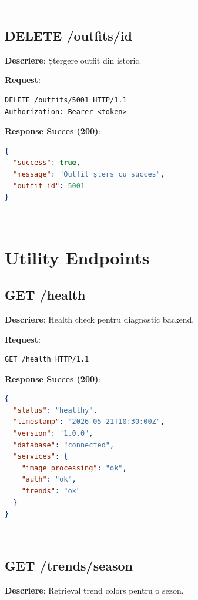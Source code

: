 ---

\subsection{DELETE /outfits/{id}}

\textbf{Descriere}: Ștergere outfit din istoric.

\textbf{Request}:

\begin{lstlisting}[language=HTTP]
DELETE /outfits/5001 HTTP/1.1
Authorization: Bearer <token>
\end{lstlisting}

\textbf{Response Succes (200)}:

\begin{lstlisting}[language=JSON]
{
  "success": true,
  "message": "Outfit șters cu succes",
  "outfit_id": 5001
}
\end{lstlisting}

---

\section{Utility Endpoints}

\subsection{GET /health}

\textbf{Descriere}: Health check pentru diagnostic backend.

\textbf{Request}:

\begin{lstlisting}[language=HTTP]
GET /health HTTP/1.1
\end{lstlisting}

\textbf{Response Succes (200)}:

\begin{lstlisting}[language=JSON]
{
  "status": "healthy",
  "timestamp": "2026-05-21T10:30:00Z",
  "version": "1.0.0",
  "database": "connected",
  "services": {
    "image_processing": "ok",
    "auth": "ok",
    "trends": "ok"
  }
}
\end{lstlisting}

---

\subsection{GET /trends/{season}}

\textbf{Descriere}: Retrieval trend colors pentru o sezon.

